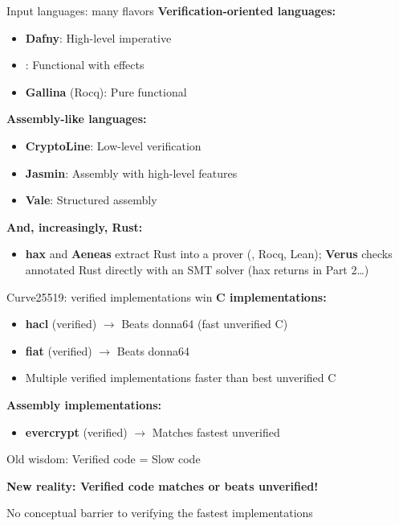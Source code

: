 \ifdefined\PRESENTATION\else\PassOptionsToClass{handout}{beamer}\fi\documentclass[aspectratio=169, lualatex]{beamer}
\begin{document}
\begin{frame}{Input languages: many flavors}
	\textbf{Verification-oriented languages:}
	\begin{itemize}
		\item \textbf{Dafny}: High-level imperative
		\item \textbf{\fstar}: Functional with effects
		\item \textbf{Gallina} (Rocq): Pure functional
	\end{itemize}
	\textbf{Assembly-like languages:}
	\begin{itemize}
		\item \textbf{CryptoLine}: Low-level verification
		\item \textbf{Jasmin}: Assembly with high-level features
		\item \textbf{Vale}: Structured assembly
	\end{itemize}
	\textbf{And, increasingly, Rust:}
	\begin{itemize}
		\item \textbf{hax} and \textbf{Aeneas} extract Rust into a prover (\fstar, Rocq, Lean); \textbf{Verus} checks annotated Rust directly with an SMT solver (hax returns in Part 2\ldots)
	\end{itemize}
\end{frame}

\begin{frame}{Curve25519: verified implementations win}
	\textbf{C implementations:}
	\begin{itemize}
		\item \textbf{hacl} (verified) $\rightarrow$ Beats donna64 (fast unverified C)
		\item \textbf{fiat} (verified) $\rightarrow$ Beats donna64
		\item Multiple verified implementations faster than best unverified C
	\end{itemize}
	\vspace{0.5em}
	\textbf{Assembly implementations:}
	\begin{itemize}
		\item \textbf{evercrypt} (verified) $\rightarrow$ Matches fastest unverified
	\end{itemize}
	\vspace{0.5em}
	\begin{center}
		\Large
		Old wisdom: Verified code = Slow code

		\textbf{New reality: Verified code matches or beats unverified!}

		\normalsize
		\vspace{0.3em}
		No conceptual barrier to verifying the fastest implementations
	\end{center}
\end{frame}
\end{document}
